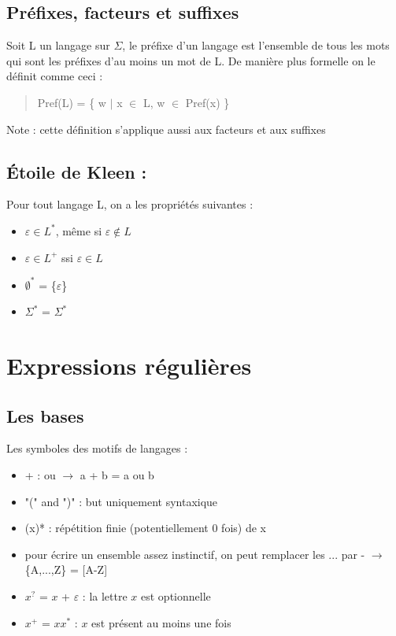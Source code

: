 \documentclass{article}
\begin{document}
\subsection{Préfixes, facteurs et suffixes}
Soit L un langage sur $\Sigma$, le préfixe d'un langage est l'ensemble de tous les mots qui sont les préfixes d'au moins un mot de L. De manière plus formelle on le définit comme ceci :
\begin{quote}
    \item Pref(L) = \{ w $|$ x $\in$ L, w $\in$ Pref(x) \} 
\end{quote}
Note : cette définition s'applique aussi aux facteurs et aux suffixes
\subsection{Étoile de Kleen :}
Pour tout langage L, on a les propriétés suivantes :
\begin{itemize}
    \item $\varepsilon \in L^{*}$, même si $\varepsilon \notin L$
    \item $\varepsilon \in L^{+}$ ssi $\varepsilon \in L$
    \item $\emptyset^{*}$ = \{$\varepsilon$\}
    \item $\Sigma^{*}$ = $\Sigma^{*}$
\end{itemize}
\newpage
\section{Expressions régulières}
\subsection{Les bases}
Les symboles des motifs de langages :
\begin{itemize}
    \item + : ou $\rightarrow$ a + b = a ou b
    \item "(" and ")" : but uniquement syntaxique
    \item (x)* : répétition finie (potentiellement 0 fois) de x
    \item pour écrire un ensemble assez instinctif, on peut remplacer les ... par - \newline $\rightarrow$ \{A,...,Z\} = [A-Z]
    \item $x^{?}$ = $x$ + $\varepsilon$ : la lettre $x$ est optionnelle
    \item $x^{+}$ = $xx^{*}$ : $x$ est présent au moins une fois
\end{itemize}
\end{document}
